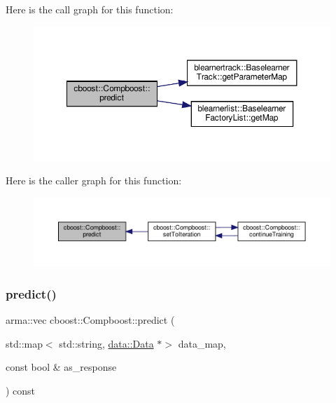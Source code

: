 Here is the call graph for this function\+:\nopagebreak
\begin{figure}[H]
\begin{center}
\leavevmode
\includegraphics[width=350pt]{classcboost_1_1_compboost_a32d1066a24607ff6ef2f934002adf62b_cgraph}
\end{center}
\end{figure}
Here is the caller graph for this function\+:\nopagebreak
\begin{figure}[H]
\begin{center}
\leavevmode
\includegraphics[width=350pt]{classcboost_1_1_compboost_a32d1066a24607ff6ef2f934002adf62b_icgraph}
\end{center}
\end{figure}
\mbox{\label{classcboost_1_1_compboost_a51c59cdddec77c2bed757aadad6afe1d}} 
\subsubsection{\texorpdfstring{predict()}{predict()}\hspace{0.1cm}{\footnotesize\ttfamily [2/2]}}
{\footnotesize\ttfamily arma\+::vec cboost\+::\+Compboost\+::predict (\begin{DoxyParamCaption}\item[{std\+::map$<$ std\+::string, \hyperlink{classdata_1_1_data}{data\+::\+Data} $\ast$$>$}]{data\+\_\+map,  }\item[{const bool \&}]{as\+\_\+response }\end{DoxyParamCaption}) const}

